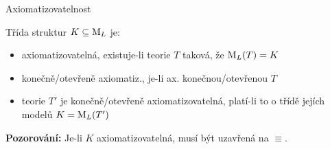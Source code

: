 \documentclass{beamer}
\begin{document}
\begin{frame}{Axiomatizovatelnost}
        
    Třída struktur $K\subseteq\operatorname{M}_L$ je:
    
    \begin{itemize}
        \item \alert{axiomatizovatelná}, existuje-li teorie $T$ taková, že $\operatorname{M}_L(T)=K$
        \item \alert{konečně}/\alert{otevřeně} axiomatiz., je-li ax. konečnou/otevřenou $T$
        \item teorie $T'$ je \alert{konečně}/\alert{otevřeně} axiomatizovatelná, platí-li to o třídě jejích modelů $K=\operatorname{M}_L(T')$
    \end{itemize}

    \textbf{Pozorování:} Je-li $K$ axiomatizovatelná, musí být uzavřená na $\equiv$.

    \medskip
    

\end{frame}
\end{document}
